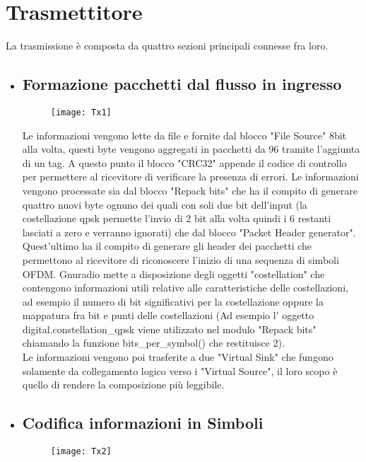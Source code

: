  \section{Trasmettitore}
 La trasmissione è composta da quattro sezioni principali connesse fra loro.
 \begin{itemize}
 	\item \subsection{Formazione pacchetti dal flusso in ingresso}
 	\begin{figure}[h]
 		\raggedleft
 		\texttt{[image: Tx1]}
 		\caption{}
 	\end{figure}
 Le informazioni vengono lette da file e fornite dal blocco "File Source" 8bit alla volta, questi byte vengono aggregati in pacchetti da 96 tramite l'aggiunta di un tag. A questo punto il blocco "CRC32" appende il codice di controllo per permettere al ricevitore di verificare la presenza di errori. Le informazioni vengono processate sia dal blocco "Repack bits" che ha il compito di generare quattro nuovi byte ognuno dei quali con soli due bit dell'input (la costellazione qpsk permette l'invio di 2 bit alla volta quindi i 6 restanti lasciati a zero e verranno ignorati) che dal blocco "Packet Header generator". Quest'ultimo ha il compito di generare gli header dei pacchetti che permettono al ricevitore di riconoscere l'inizio di una sequenza di simboli OFDM. Gnuradio mette a disposizione degli oggetti "costellation" che contengono informazioni utili relative alle caratteristiche delle costellazioni, ad esempio il numero di bit significativi per la costellazione oppure la mappatura fra bit e punti delle costellazioni (Ad esempio l' oggetto digital.constellation\_qpsk viene utilizzato nel modulo "Repack bits" chiamando la funzione bits\_per\_symbol() che restituisce 2).\\ Le informazioni vengono poi trasferite a due "Virtual Sink" che fungono solamente da collegamento logico verso i "Virtual Source", il loro scopo è quello di rendere la composizione più leggibile.
 	\item \subsection{Codifica informazioni in Simboli}
 	\begin{figure}[h]
 		\raggedleft
 		\texttt{[image: Tx2]}
 		\caption{}
 	\end{figure}

\end{itemize}
